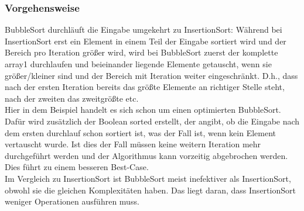 \documentclass[
../AuD-Zusammenfassung.tex,
]
{subfiles}
\begin{document}
\subsubsection{Vorgehensweise}
BubbleSort durchläuft die Eingabe umgekehrt zu InsertionSort: Während bei InsertionSort erst ein Element in einem Teil der Eingabe sortiert wird und der Bereich pro Iteration größer wird, wird bei BubbleSort zuerst der komplette array1 durchlaufen und beieinander liegende Elemente getauscht, wenn sie größer/kleiner sind und der Bereich mit Iteration weiter eingeschränkt. D.h., dass nach der ersten Iteration bereits das größte Elemente an richtiger Stelle steht, nach der zweiten das zweitgrößte etc.\\
Hier in dem Beispiel handelt es sich schon um einen optimierten BubbleSort. Dafür wird zusätzlich der Boolean sorted erstellt, der angibt, ob die Eingabe nach dem ersten durchlauf schon sortiert ist, was der Fall ist, wenn kein Element vertauscht wurde. Ist dies der Fall müssen keine weitern Iteration mehr durchgeführt werden und der Algorithmus kann vorzeitig abgebrochen werden. Dies führt zu einem besseren Best-Case. \\
Im Vergleich zu InsertionSort ist BubbleSort meist inefektiver als InsertionSort, obwohl sie die gleichen Komplexitäten haben. Das liegt daran, dass InsertionSort weniger Operationen ausführen muss.
\newpage
\end{document}
